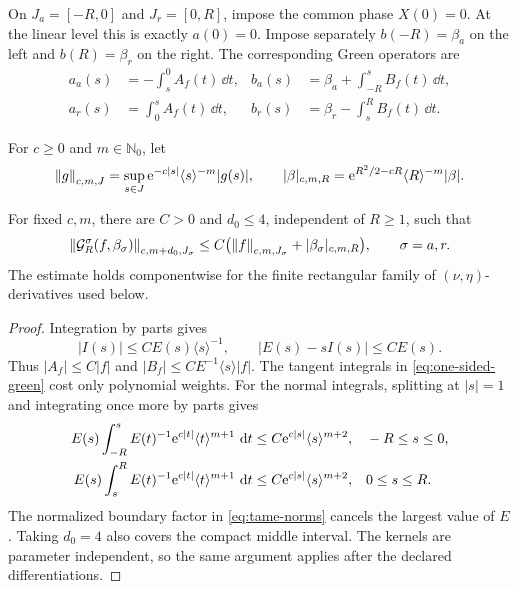 On \(J_a=[-R,0]\) and \(J_r=[0,R]\), impose the common phase
\(X(0)=0\).  At the linear level this is exactly \(a(0)=0\).  Impose
separately \(b(-R)=\beta_a\) on the left and \(b(R)=\beta_r\) on the right.
The corresponding Green operators are
\begin{equation}
\label{eq:one-sided-green}
\begin{aligned}
 a_a(s)&=-\int_s^0A_f(t)\,\dd t,&
 b_a(s)&=\beta_a+\int_{-R}^sB_f(t)\,\dd t,\\
 a_r(s)&= \int_0^sA_f(t)\,\dd t,&
 b_r(s)&=\beta_r-\int_s^RB_f(t)\,\dd t.
\end{aligned}
\end{equation}

For \(c\ge0\) and \(m\in\mathbb N_0\), let
\begin{equation}
\label{eq:tame-norms}
 \left\lVert g\right\rVert_{c,m,J}
 =\sup_{s\in J}\mathrm e^{-c|s|}\langle s\rangle^{-m}|g(s)|,
 \qquad
 |\beta|_{c,m,R}
 =\mathrm e^{R^2/2-cR}\langle R\rangle^{-m}|\beta|.
\end{equation}

\begin{lemma}
\label{lem:green}
For fixed \(c,m\), there are \(C>0\) and \(d_0\le4\), independent of
\(R\ge1\), such that
\begin{equation}
\label{eq:green-bound}
 \left\lVert \mathcal G_R^\sigma(f,\beta_\sigma)\right\rVert_{c,m+d_0,J_\sigma}
 \le C\bigl(\left\lVert f\right\rVert_{c,m,J_\sigma}+|\beta_\sigma|_{c,m,R}\bigr),
 \qquad \sigma=a,r.
\end{equation}
The estimate holds componentwise for the finite rectangular family of
\((\nu,\eta)\)-derivatives used below.
\end{lemma}

\begin{proof}
Integration by parts gives
\begin{equation}
\label{eq:I-bounds}
 |I(s)|\le CE(s)\langle s\rangle^{-1},
 \qquad |E(s)-sI(s)|\le CE(s).
\end{equation}
Thus \(|A_f|\le C|f|\) and
\(|B_f|\le CE^{-1}\langle s\rangle|f|\).  The tangent integrals in
\cref{eq:one-sided-green} cost only polynomial weights.  For the normal
integrals, splitting at \(|s|=1\) and integrating once more by parts gives
\begin{align}
 E(s)\int_{-R}^sE(t)^{-1}\mathrm e^{c|t|}\langle t\rangle^{m+1}\,\,\mathrm d t
 &\le C\mathrm e^{c|s|}\langle s\rangle^{m+2}, &&-R\le s\le0,
 \label{eq:left-gaussian-tail}\\
 E(s)\int_s^RE(t)^{-1}\mathrm e^{c|t|}\langle t\rangle^{m+1}\,\,\mathrm d t
 &\le C\mathrm e^{c|s|}\langle s\rangle^{m+2}, &&0\le s\le R.
 \label{eq:right-gaussian-tail}
\end{align}
The normalized boundary factor in \cref{eq:tame-norms} cancels the largest
value of \(E\).  Taking \(d_0=4\) also covers the compact middle interval.
The kernels are parameter independent, so the same argument applies after
the declared differentiations.
\end{proof}

